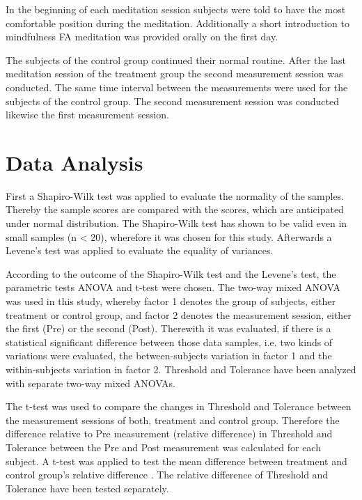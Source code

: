 In the beginning of each meditation session subjects were told to have the most comfortable position during the meditation.  Additionally a short introduction to mindfulness FA meditation was provided orally on the first day. 

The subjects of the control group continued their normal routine.
After the last meditation session of the treatment group the second measurement session was conducted. The same time interval between the measurements were used for the subjects of the control group. The second measurement session was conducted likewise the first measurement session.


\section{Data Analysis}
First a Shapiro-Wilk test was applied to evaluate the normality of the samples. Thereby the sample scores are compared with the scores, which are anticipated under normal distribution. The Shapiro-Wilk test has shown to be valid even in small samples (n < 20), wherefore it was chosen for this study. \cite{Shapiro1965,Mooi2018} Afterwards a Levene’s test was applied to evaluate the equality of variances.

According to the outcome of the Shapiro-Wilk test and the Levene’s test, the parametric tests ANOVA and t-test were chosen.
The two-way mixed ANOVA was used in this study, whereby factor 1 denotes the group of subjects, either treatment or control group, and factor 2 denotes the measurement session, either the first (Pre) or the second (Post). Therewith it was evaluated, if there is a statistical significant difference between those data samples, i.e. 
two kinds of variations were evaluated, the between-subjects variation in factor 1 and the within-subjects variation in factor 2. 
Threshold and Tolerance have been analyzed with separate two-way mixed ANOVAs. \cite{Mooi2018}

The t-test was used to compare the changes in Threshold and Tolerance between the measurement sessions of both, treatment and control group. Therefore the difference relative to Pre measurement (relative difference) in Threshold and Tolerance between the Pre and Post measurement was calculated for each subject. A t-test was applied to test the mean difference between treatment and control group’s relative difference \cite{Mooi2018}. The relative difference of Threshold and Tolerance have been tested separately. 



